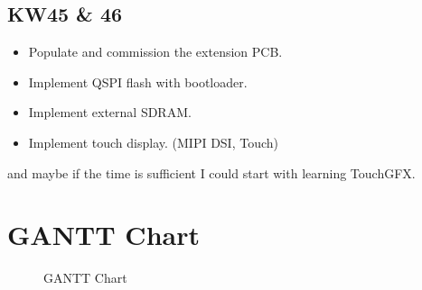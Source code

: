 \subsection{KW45 \& 46}
\begin{itemize}
  \item Populate and commission the extension PCB.
  \item Implement QSPI flash with bootloader.
  \item Implement external SDRAM.
  \item Implement touch display. (MIPI DSI, Touch)
\end{itemize}
and maybe if the time is sufficient I could start with learning TouchGFX.

\newpage



\section{GANTT Chart}
\label{sec:GANTT Chart}
\label{fig:GANTT Chart}
\begin{figure}[H]
	\centering
	\caption{GANTT Chart}
\end{figure}
\newpage




